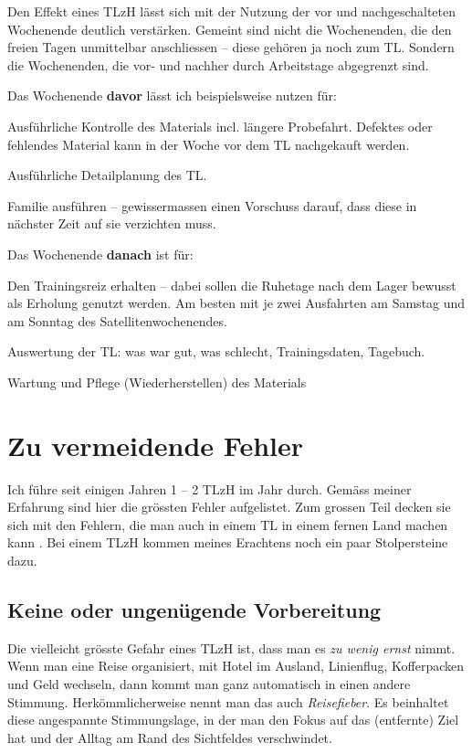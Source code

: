 \documentclass[a4paper,DIV13,BCOR0cm,draft=TRUE]{scrartcl}
\newcommand{\tlzh}{TLzH}
\begin{document}
Den Effekt eines \tlzh{} lässt sich mit der Nutzung der vor und nachgeschalteten Wochenende deutlich verstärken.
Gemeint sind nicht die Wochenenden, die den freien Tagen unmittelbar anschliessen -- diese gehören ja noch zum TL.
Sondern die Wochenenden, die vor- und nachher durch Arbeitstage abgegrenzt sind.

Das Wochenende \textbf{davor} lässt ich beispielsweise nutzen für:
\begin{itemize*}
  \item Ausführliche Kontrolle des Materials incl. längere Probefahrt.
    Defektes oder fehlendes Material kann in der Woche vor dem TL nachgekauft werden.
  \item Ausführliche Detailplanung des TL.
  \item Familie ausführen -- gewissermassen einen Vorschuss darauf, dass diese in nächster Zeit auf sie verzichten muss.
\end{itemize*}

Das Wochenende \textbf{danach} ist für:

\begin{itemize*}
  \item Den Trainingsreiz erhalten -- dabei sollen die Ruhetage nach dem Lager bewusst als Erholung genutzt werden.
    Am besten mit je zwei Ausfahrten am Samstag und am Sonntag des Satellitenwochenendes.
  \item Auswertung der TL: was war gut, was schlecht, Trainingsdaten, Tagebuch.
  \item Wartung und Pflege (Wiederherstellen) des Materials
\end{itemize*}


\section{Zu vermeidende Fehler}

Ich führe seit einigen Jahren 1 -- 2 \tlzh{} im Jahr durch.
Gemäss meiner Erfahrung sind hier die grössten Fehler aufgelistet.
Zum grossen Teil decken sie sich mit den Fehlern, die man auch in einem TL in einem fernen Land machen kann \cite{Beck2016trainingslagersuenden}.
Bei einem \tlzh{} kommen meines Erachtens noch ein paar Stolpersteine dazu.

\subsection{Keine oder ungenügende Vorbereitung}

Die vielleicht grösste Gefahr eines \tlzh{} ist, dass man es \emph{zu wenig ernst} nimmt.
Wenn man eine Reise organisiert, mit Hotel im Ausland, Linienflug, Kofferpacken und Geld wechseln, 
dann kommt man ganz automatisch in einen andere Stimmung.
Herkömmlicherweise nennt man das auch \emph{Reisefieber}.
Es beinhaltet diese angespannte Stimmungslage, in der man den Fokus auf das (entfernte) Ziel hat und der Alltag am Rand des Sichtfeldes verschwindet.
\end{document}
